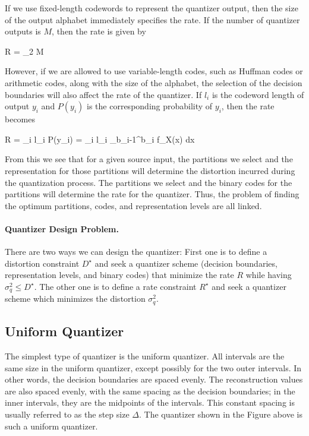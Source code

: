 If we use fixed-length codewords to represent the quantizer output, then the size of the output alphabet immediately specifies the rate. If the number of quantizer outputs is $M$, then the rate is given by

\bee
R = \lceil \log_2 M \rceil
\eee

However, if we are allowed to use variable-length codes, such as Huffman codes or arithmetic codes, along with the size of the alphabet, the selection of the decision boundaries will also affect the rate of the quantizer. If $l_i$ is the codeword length of output $y_i$ and $P(y_i)$ is the corresponding probability of $y_i$, then the rate becomes

\bee
R = \sum_i l_i P(y_i) = \sum_i l_i \int_{b_{i-1}}^{b_i} f_X(x) dx
\eee

From this we see that for a given source input, the partitions we select and the representation for those partitions will determine the distortion incurred during the quantization process. The partitions we select and the binary codes for the partitions will determine the rate for the quantizer. Thus, the problem of finding the optimum partitions, codes, and representation levels are all linked.

\paragraph{Quantizer Design Problem.} There are two ways we can design the quantizer: First one is to define a distortion constraint $D^\star$ and seek a quantizer scheme (decision boundaries, representation levels, and binary codes) that minimize the rate $R$ while having $\sigma_q^2 \leq D^\star$. The other one is to define a rate constraint $R^\star$ and seek a quantizer scheme which minimizes the distortion $\sigma_q^2$.

\subsection{Uniform Quantizer}

The simplest type of quantizer is the uniform quantizer. All intervals are the same size in the uniform quantizer, except possibly for the two outer intervals. In other words, the decision boundaries are spaced evenly. The reconstruction values are also spaced evenly, with the same spacing as the decision boundaries; in the inner intervals, they are the midpoints of the intervals. This constant spacing is usually referred to as the step size $\Delta$. The quantizer shown in the Figure above is such a uniform quantizer.

